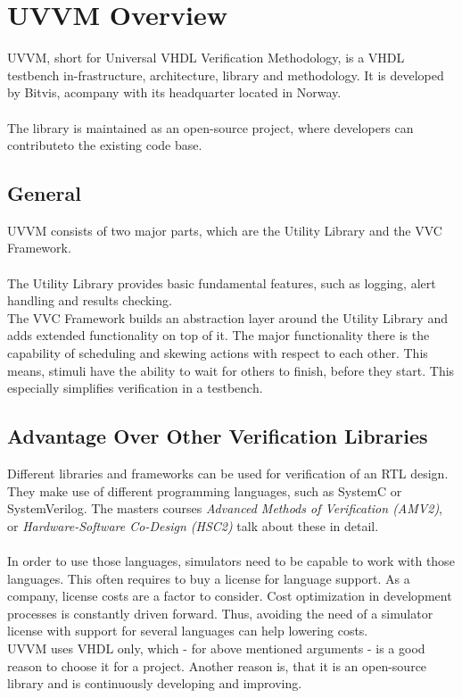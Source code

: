 \section{UVVM Overview}

UVVM, short for Universal VHDL Verification Methodology, is a VHDL testbench in-frastructure, architecture, library and methodology. It is developed by Bitvis, acompany with its headquarter located in Norway.\\
\\
The library is maintained as an open-source project, where developers can contributeto the existing code base.

\subsection{General}

UVVM consists of two major parts, which are the Utility Library and the VVC Framework.\\
\\
The Utility Library provides basic fundamental features, such as logging, alert handling and results checking.\\
The VVC Framework builds an abstraction layer around the Utility Library and adds extended functionality on top of it. The major functionality there is the capability of scheduling and skewing actions with respect to each other. This means, stimuli have the ability to wait for others to finish, before they start. This especially simplifies verification in a testbench.

\subsection{Advantage Over Other Verification Libraries}

Different libraries and frameworks can be used for verification of an RTL design. They make use of different programming languages, such as SystemC or SystemVerilog. The masters courses \textit{Advanced Methods of Verification (AMV2)}, or \textit{Hardware-Software Co-Design (HSC2)} talk about these in detail.\\
\\
In order to use those languages, simulators need to be capable to work with those languages. This often requires to buy a license for language support. As a company, license costs are a factor to consider. Cost optimization in development processes is constantly driven forward. Thus, avoiding the need of a simulator license with support for several languages can help lowering costs.\\
UVVM uses VHDL only, which - for above mentioned arguments - is a good reason to choose it for a project. Another reason is, that it is an open-source library and is continuously developing and improving.

